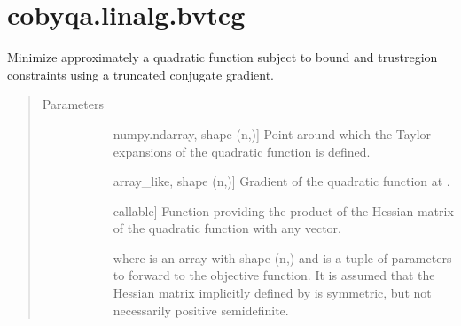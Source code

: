 \documentclass[letterpaper,10pt,english]{sphinxmanual}
\begin{document}
\section{cobyqa.linalg.bvtcg}
\label{\detokenize{refs/generated/cobyqa.linalg.bvtcg:cobyqa-linalg-bvtcg}}\label{\detokenize{refs/generated/cobyqa.linalg.bvtcg::doc}}

\begin{fulllineitems}
\label{\detokenize{refs/generated/cobyqa.linalg.bvtcg:cobyqa.linalg.bvtcg}}
\sphinxAtStartPar
Minimize approximately a quadratic function subject to bound and
trust\sphinxhyphen{}region constraints using a truncated conjugate gradient.
\begin{quote}\begin{description}
\item[{Parameters}] \leavevmode\begin{description}
\item[{}] \leavevmode{[}numpy.ndarray, shape (n,){]}
\sphinxAtStartPar
Point around which the Taylor expansions of the quadratic function is
defined.

\item[{}] \leavevmode{[}array\_like, shape (n,){]}
\sphinxAtStartPar
Gradient of the quadratic function at .

\item[{}] \leavevmode{[}callable{]}
\sphinxAtStartPar
Function providing the product of the Hessian matrix of the quadratic
function with any vector.
\begin{quote}

\sphinxAtStartPar
{}
\end{quote}

\sphinxAtStartPar
where  is an array with shape (n,) and  is a tuple of
parameters to forward to the objective function. It is assumed that the
Hessian matrix implicitly defined by  is symmetric, but not
necessarily positive semidefinite.


\end{description}
\end{description}
\end{quote}
\end{fulllineitems}
\end{document}
